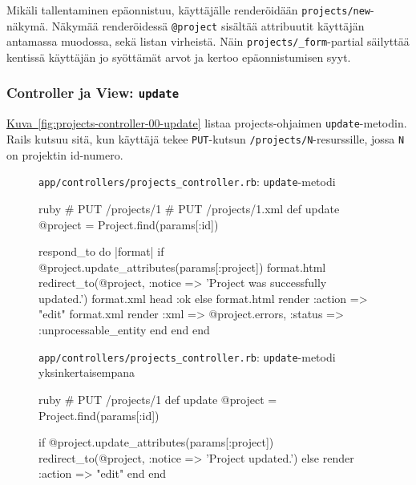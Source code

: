\documentclass{article}
\newenvironment{myfigure}[1][tbp]{
  \begin{figure}[#1]
    \centering
    \begin{lrbox}{\myfigurebox}
      \begin{minipage}{\textwidth}
}{
      \end{minipage}
    \end{lrbox}
    \colorbox{blue!4}{\usebox{\myfigurebox}}
  \end{figure}
}
\newcommand{\myref}[2]{\hyperref[#2]{#1~\ref*{#2}}}
\newcommand{\pdfforeignlanguage}[2]{\texorpdfstring{\foreignlanguage{#1}{#2}}{#2}}
\newcommand{\eng}[1]{\pdfforeignlanguage{english}{#1}}
\begin{document}
Mikäli tallentaminen epäonnistuu, käyttäjälle renderöidään
\texttt{projects/new}-näkymä. Näkymää renderöidessä \texttt{@project} sisältää
attribuutit käyttäjän antamassa muodossa, sekä listan virheistä. Näin
\texttt{projects/\_form}-\eng{partial} säilyttää kentissä käyttäjän jo
syöttämät arvot ja kertoo epäonnistumisen syyt.

\subsubsection{\eng{Controller} ja \eng{View}: \texttt{update}}

\begin{samepage}
\myref{Kuva}{fig:projects-controller-00-update} listaa projects-ohjaimen
\texttt{update}-metodin. Rails kutsuu sitä, kun käyttäjä tekee
\texttt{PUT}-kutsun \texttt{/projects/N}-resurssille, jossa \texttt{N} on
projektin id-numero.

\begin{myfigure}[H]
\caption{\texttt{app/controllers/projects\_controller.rb}:
\texttt{update}-metodi}
\label{fig:projects-controller-00-update}

\begin{pygmented}{ruby}
  # PUT /projects/1
  # PUT /projects/1.xml
  def update
    @project = Project.find(params[:id])

    respond_to do |format|
      if @project.update_attributes(params[:project])
        format.html { redirect_to(@project, :notice => 'Project was successfully updated.') }
        format.xml  { head :ok }
      else
        format.html { render :action => "edit" }
        format.xml  { render :xml => @project.errors, :status => :unprocessable_entity }
      end
    end
  end
\end{pygmented}

\caption{\texttt{app/controllers/projects\_controller.rb}:
\texttt{update}-metodi yksinkertaisempana}
\label{fig:projects-controller-01-update}

\begin{pygmented}{ruby}
  # PUT /projects/1
  def update
    @project = Project.find(params[:id])

    if @project.update_attributes(params[:project])
      redirect_to(@project, :notice => 'Project updated.')
    else
      render :action => "edit"
    end
  end
\end{pygmented}
\end{myfigure}
\end{samepage}
\end{document}
